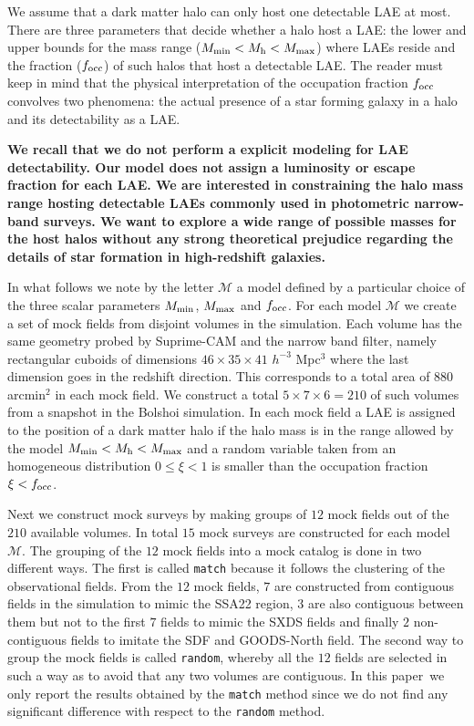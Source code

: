 \documentclass[usenatbib]{mn2e}
\newcommand{\documentname}{paper~}
\begin{document}
We assume that a dark matter halo can only host one
detectable LAE at most.  There are three parameters that
decide whether a halo host a LAE: the lower and upper bounds for the
mass range ($M_{\rm min}< M_{\rm h} < M_{\rm max}$) where LAEs reside
and the fraction ($f_{\rm occ}$) of such halos that host a detectable
LAE. The reader must keep in mind that the physical interpretation of
the occupation fraction $f_{\rm occ}$ convolves two phenomena: the
actual presence of a star forming galaxy in a halo and its
detectability as a LAE. 

{\bf We recall that we do not perform a explicit modeling for LAE
detectability. Our model does not assign a luminosity or escape
fraction for each LAE. We are interested in constraining the halo
mass range hosting detectable LAEs commonly used in photometric
narrow-band surveys. We want to explore a wide range of
possible masses for the host halos without any strong theoretical
prejudice regarding the details of star formation in high-redshift
galaxies. }


In what follows we note by the letter ${\mathcal M}$ a model
defined by a particular choice of the three scalar parameters $M_{\rm
  min}$, $M_{\rm  max}$ and $f_{\rm occ}$. For each model ${\mathcal
  M}$ we create a set of mock fields from disjoint volumes in the
simulation. Each volume has the same geometry probed by Suprime-CAM
and the narrow band filter, namely rectangular cuboids of dimensions
$46\times 35\times 41$ $h^{-3}$ Mpc$^{3}$ where the last dimension goes
in the redshift direction. This corresponds to a total area of $880$
arcmin$^{2}$ in each mock field. We construct a total $5\times 7
\times 6=210$ of such volumes from a snapshot in the Bolshoi
simulation. In each mock field a LAE is assigned to the position of a
dark matter halo if the halo mass is in the range allowed by the model
$M_{\rm min}<M_{\rm h}<M_{\rm max}$ and a random variable taken from
an homogeneous distribution $0\leq \xi<1$ is smaller than the occupation
fraction $\xi<f_{\rm occ}$.

Next we construct mock surveys by making groups of $12$ mock fields
out of the $210$ available volumes. In total $15$ mock surveys are
constructed for each model $\mathcal{M}$. The grouping of the $12$
mock fields into a mock catalog is done in two different ways. The
first is called {\texttt{match}} because it follows the clustering of the
observational fields. From the $12$ mock fields, $7$ are constructed
from contiguous fields in the simulation to mimic the SSA22 region,
$3$ are also contiguous between them but not to the first $7$ fields
to mimic the SXDS fields and finally $2$ non-contiguous fields to
imitate the SDF and GOODS-North field.   The second way to group the
mock fields is called {\texttt{random}}, whereby all the $12$ fields
are selected in such a way as to avoid that any two volumes are
contiguous. In this \documentname we only report the results obtained
by the {\texttt{match}} method since we do not find any significant
difference with respect to the {\texttt{random}} method.
\end{document}
